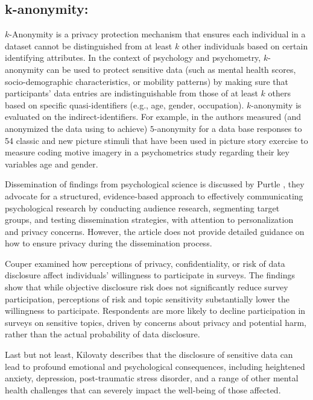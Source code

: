 \documentclass{article}
\begin{document}
\subsection{k-anonymity:}
$k$-Anonymity is a privacy protection mechanism that ensures each individual in a dataset cannot be distinguished from at least $k$  other individuals based on certain identifying attributes. In the context of psychology and psychometry, $k$-anonymity can be used to protect sensitive data (such as mental health scores, socio-demographic characteristics, or mobility patterns) by making sure that participants’ data entries are indistinguishable from those of at least $k$  others based on specific quasi-identifiers (e.g., age, gender, occupation).  $k$-anonymity is evaluated on the indirect-identifiers. For example, in \citep{schoenbrodt21} the authors measured (and anonymized the data using \cite{2024_Sdcmicro} to achieve) $5$-anonymity for a data base responses to 54 classic and new picture stimuli that have
been used in picture story exercise to measure coding motive imagery in a psychometrics study regarding their key variables age and gender.

\color{black}



Dissemination of findings from psychological science is discussed by Purtle \cite{2020_Purtle}, they advocate for a structured, evidence-based approach to effectively communicating psychological research by conducting audience research, segmenting target groups, and testing dissemination strategies, with attention to personalization and privacy concerns. However, the article does not provide detailed guidance on how to ensure privacy during the dissemination process.

Couper \cite{2008_Couper} examined how perceptions of privacy, confidentiality, or risk of data disclosure affect individuals' willingness to participate in surveys. The findings show that while objective disclosure risk does not significantly reduce survey participation, perceptions of risk and topic sensitivity substantially lower the willingness to participate. Respondents are more likely to decline participation in surveys on sensitive topics, driven by concerns about privacy and potential harm, rather than the actual probability of data disclosure.

Last but not least, Kilovaty \cite{2021_Kilovaty} describes that the disclosure of sensitive data can lead to profound emotional and psychological consequences, including heightened anxiety, depression, post-traumatic stress disorder, and a range of other mental health challenges that can severely impact the well-being of those affected.
\end{document}
